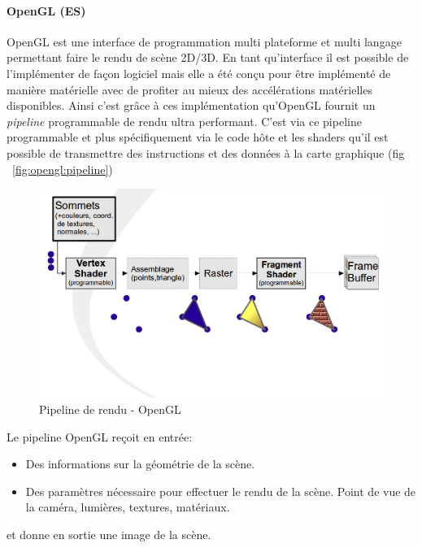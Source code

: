 \paragraph{OpenGL (ES)} 
OpenGL est une interface de programmation multi plateforme et multi langage permettant faire le rendu de scène 2D/3D. En tant qu'interface il est possible de l'implémenter de façon logiciel mais elle a été conçu pour être implémenté de manière matérielle avec de profiter au mieux des accélérations matérielles disponibles. Ainsi c'est grâce à ces implémentation qu'OpenGL fournit un \emph{pipeline} programmable de rendu ultra performant. C'est via ce pipeline programmable et plus spécifiquement via le code hôte et les shaders qu'il est possible de transmettre des instructions et des données à la carte graphique (fig ~\ref{fig:opengl:pipeline})

\begin{figure}[H]
\centering
\includegraphics[width=\linewidth]{images/opengl-pipeline}
\caption{Pipeline de rendu - OpenGL\protect\footnotemark}
\end{figure}


Le pipeline OpenGL reçoit en entrée:
\begin{itemize}
\item Des informations sur la géométrie de la scène.
\item Des paramètres nécessaire pour effectuer le rendu de la scène. Point de vue de la caméra, lumières, textures, matériaux.
\end{itemize}
et donne en sortie une image de la scène.

